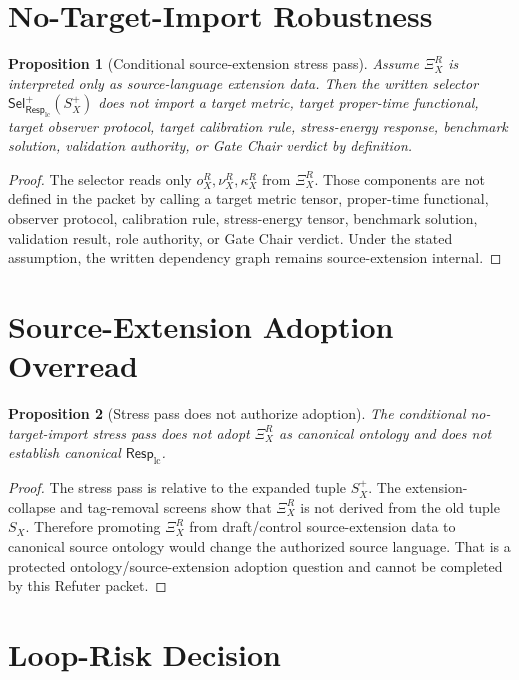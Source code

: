 \documentclass[11pt]{article}
\newcommand{\RespLC}{\mathsf{Resp}_{\mathrm{lc}}}
\newcommand{\SelResp}{\mathsf{Sel}_{\RespLC}}
\newcommand{\XiR}{\Xi_X^R}
\newcommand{\SX}{S_X}
\newcommand{\Splus}{S_X^+}
\newtheorem{proposition}{Proposition}
\begin{document}
\section{No-Target-Import Robustness}

\begin{proposition}[Conditional source-extension stress pass]
Assume \(\XiR\) is interpreted only as source-language extension data.
Then the written selector \(\SelResp^{+}(\Splus)\) does not import a
target metric, target proper-time functional, target observer protocol,
target calibration rule, stress-energy response, benchmark solution,
validation authority, or Gate Chair verdict by definition.
\end{proposition}

\begin{proof}
The selector reads only \(o_X^R,\nu_X^R,\kappa_X^R\) from \(\XiR\).
Those components are not defined in the packet by calling a target
metric tensor, proper-time functional, observer protocol, calibration
rule, stress-energy tensor, benchmark solution, validation result, role
authority, or Gate Chair verdict. Under the stated assumption, the
written dependency graph remains source-extension internal.
\end{proof}

\section{Source-Extension Adoption Overread}

\begin{proposition}[Stress pass does not authorize adoption]
The conditional no-target-import stress pass does not adopt \(\XiR\) as
canonical ontology and does not establish canonical \(\RespLC\).
\end{proposition}

\begin{proof}
The stress pass is relative to the expanded tuple \(\Splus\). The
extension-collapse and tag-removal screens show that \(\XiR\) is not
derived from the old tuple \(\SX\). Therefore promoting \(\XiR\) from
draft/control source-extension data to canonical source ontology would
change the authorized source language. That is a protected
ontology/source-extension adoption question and cannot be completed by
this Refuter packet.
\end{proof}

\section{Loop-Risk Decision}
\end{document}
